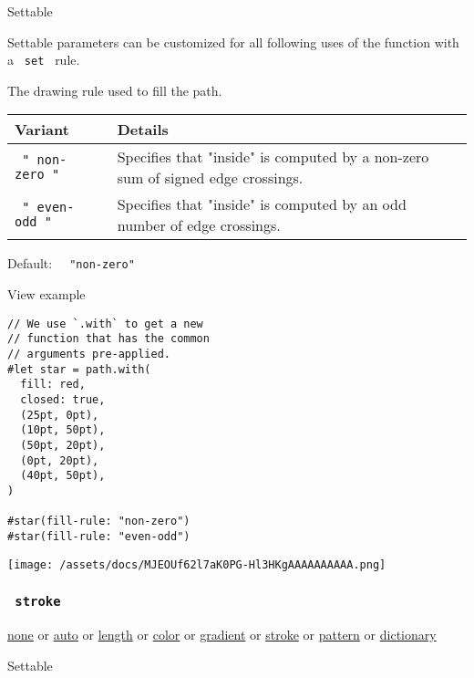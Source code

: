 {{ Settable }}

\label{parameters-fill-rule-settable-tooltip}
Settable parameters can be customized for all following uses of the
function with a \texttt{\ set\ } rule.

The drawing rule used to fill the path.

\begin{longtable}[]{@{}ll@{}}
\toprule\noalign{}
Variant & Details \\
\midrule\noalign{}
\endhead
\bottomrule\noalign{}
\endlastfoot
\texttt{\ "\ non-zero\ "\ } & Specifies that "inside" is computed by a
non-zero sum of signed edge crossings. \\
\texttt{\ "\ even-odd\ "\ } & Specifies that "inside" is computed by an
odd number of edge crossings. \\
\end{longtable}

Default: \texttt{\ }{\texttt{\ "non-zero"\ }}\texttt{\ }


View example

\begin{verbatim}
// We use `.with` to get a new
// function that has the common
// arguments pre-applied.
#let star = path.with(
  fill: red,
  closed: true,
  (25pt, 0pt),
  (10pt, 50pt),
  (50pt, 20pt),
  (0pt, 20pt),
  (40pt, 50pt),
)

#star(fill-rule: "non-zero")
#star(fill-rule: "even-odd")
\end{verbatim}

\texttt{[image: /assets/docs/MJEOUf62l7aK0PG-Hl3HKgAAAAAAAAAA.png]}

\subsubsection{\texorpdfstring{\texttt{\ stroke\ }}{ stroke }}\label{parameters-stroke}

\href{/docs/reference/foundations/none/}{none} {or}
\href{/docs/reference/foundations/auto/}{auto} {or}
\href{/docs/reference/layout/length/}{length} {or}
\href{/docs/reference/visualize/color/}{color} {or}
\href{/docs/reference/visualize/gradient/}{gradient} {or}
\href{/docs/reference/visualize/stroke/}{stroke} {or}
\href{/docs/reference/visualize/pattern/}{pattern} {or}
\href{/docs/reference/foundations/dictionary/}{dictionary}

{{ Settable }}

